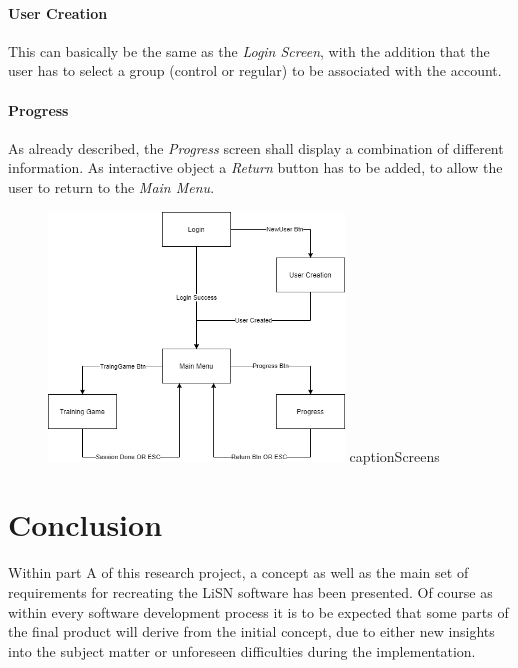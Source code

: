 \documentclass[a4paper,11pt]{article}%
\renewcommand{\\}{\vspace*{0.5\baselineskip} \newline}
\begin{document}
\paragraph{User Creation} This can basically be the same as the \textit{Login Screen}, with the addition that the user has to select a group (control or regular) to be associated with the account.

\paragraph{Progress} As already described, the \textit{Progress} screen shall display a combination of different information. As interactive object a \textit{Return} button has to be added, to allow the user to return to the \textit{Main Menu}.

\vspace{5mm}
\begin{figure}[h!]
\centering
\includegraphics[width=0.7\textwidth]{screens2.png}
caption{Screens}
\label{fig:screens}
\vspace{3mm}
\end{figure}






\section{Conclusion}
\label{sec:conclusion}
Within part A of this research project, a concept as well as the main set of requirements for recreating the \ac{LiSN} software has been presented. Of course as within every software development process it is to be expected that some parts of the final product will derive from the initial concept, due to either new insights into the subject matter or unforeseen difficulties during the implementation.
\end{document}
